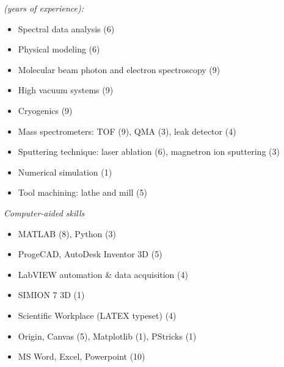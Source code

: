 \documentclass{sebase}
\begin{document}
\bigskip

\textit{(years of experience):}

\begin{multicols}{2}%

\begin{itemize}
\item Spectral data analysis (6)

\item Physical modeling (6)

\item Molecular beam photon and electron spectroscopy (9)

\item High vacuum systems (9)

\item Cryogenics (9)

\item Mass spectrometers: TOF (9), QMA (3), leak detector (4)

\item Sputtering technique: laser ablation (6), magnetron ion sputtering (3)

\item Numerical simulation (1)

\item Tool machining: lathe and mill (5)
\end{itemize}

\emph{Computer-aided skills}

\begin{itemize}
\item MATLAB (8), Python (3)

\item ProgeCAD, AutoDesk Inventor 3D (5)

\item LabVIEW automation \& data acquisition (4)

\item SIMION 7 3D (1)

\item Scientific Workplace (LATEX typeset) (4)

\item Origin, Canvas (5), Matplotlib (1), PStricks (\TEXTsymbol{<}1)

\item MS Word, Excel, Powerpoint (\TEXTsymbol{>}10)
\end{itemize}

\end{multicols}%
\end{document}
